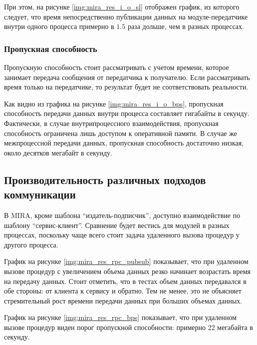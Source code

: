 При этом, на рисунке  \ref{img:mira_res_i_o_sl} отображен график, из которого следует, что время непосредственно публикации данных на модуле-передатчике внутри одного процесса примерно в $1.5$ раза дольше, чем в разных процессах.

\subsubsection{Пропускная способность}

Пропускную способность стоит рассматривать с учетом времени, которое занимает передача сообщения от передатчика к получателю. Если рассматривать время только на передатчике, то результат будет не соответствовать реальности. 


Как видно из графика на рисунке \ref{img:mira_res_i_o_bps}, пропускная способность передачи данных внутри процесса составляет гигабайты в секунду. Фактически, в случае внутрипроцессного взаимодействия, пропускная способность ограничена лишь доступом к оперативной памяти. В случае же межпроцессной передачи данных, пропускная способность достаточно низкая, около десятков мегабайт в секунду.

\subsection{Производительность различных подходов коммуникации}


В MIRA, кроме шаблона \enquote{издатель-подписчик}, доступно взаимодействие по шаблону \enquote{сервис-клиент}. Сравнение будет вестись для модулей в разных процессах, поскольку чаще всего стоит задача удаленного вызова процедур у другого процесса.

График на рисунке \ref{img:mira_res_rpc_pubsub} показывает, что при удаленном вызове процедур с увеличением объема данных резко начинает возрастать время на передачу данных. Стоит отметить, что в тестах объем данных передавался в обе стороны: от клиента к сервису и обратно. Тем не менее, это не объясняет стремительный рост времени передачи данных при больших объемах данных.

График на рисунке \ref{img:mira_res_rpc_bps} показывает, что при удаленном вызове процедур виден порог пропускной способности: примерно 22 мегабайта в секунду.